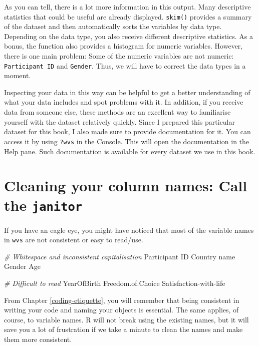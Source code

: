 \documentclass[
]{book}
\newenvironment{Shaded}{\begin{snugshade}}{\end{snugshade}}
\newcommand{\CommentTok}[1]{\textcolor[rgb]{0.56,0.35,0.01}{\textit{#1}}}
\newcommand{\NormalTok}[1]{#1}
\newcommand{\SpecialCharTok}[1]{\textcolor[rgb]{0.00,0.00,0.00}{#1}}
\begin{document}
As you can tell, there is a lot more information in this output. Many descriptive statistics that could be useful are already displayed. \texttt{skim()} provides a summary of the dataset and then automatically sorts the variables by data type. Depending on the data type, you also receive different descriptive statistics. As a bonus, the function also provides a histogram for numeric variables. However, there is one main problem: Some of the numeric variables are not numeric: \texttt{Participant\ ID} and \texttt{Gender}. Thus, we will have to correct the data types in a moment.

Inspecting your data in this way can be helpful to get a better understanding of what your data includes and spot problems with it. In addition, if you receive data from someone else, these methods are an excellent way to familiarise yourself with the dataset relatively quickly. Since I prepared this particular dataset for this book, I also made sure to provide documentation for it. You can access it by using \texttt{?wvs} in the Console. This will open the documentation in the Help pane. Such documentation is available for every dataset we use in this book.

\hypertarget{colnames-cleaning}{%
\section{\texorpdfstring{Cleaning your column names: Call the \texttt{janitor}}{Cleaning your column names: Call the janitor}}\label{colnames-cleaning}}

If you have an eagle eye, you might have noticed that most of the variable names in \texttt{wvs} are not consistent or easy to read/use.

\hypertarget{messy_column_names}{%
\label{messy_column_names}}%
\begin{Shaded}
\begin{Highlighting}[]
\CommentTok{\# Whitespace and inconsistent capitalisation}
\NormalTok{Participant ID        }
\NormalTok{Country name          }
\NormalTok{Gender                }
\NormalTok{Age                   }

\CommentTok{\# Difficult to read}
\NormalTok{YearOfBirth           }
\NormalTok{Freedom.of.Choice     }
\NormalTok{Satisfaction}\SpecialCharTok{{-}}\NormalTok{with}\SpecialCharTok{{-}}\NormalTok{life}
\end{Highlighting}
\end{Shaded}

From Chapter \ref{coding-etiquette}, you will remember that being consistent in writing your code and naming your objects is essential. The same applies, of course, to variable names. R will not break using the existing names, but it will save you a lot of frustration if we take a minute to clean the names and make them more consistent.
\end{document}
